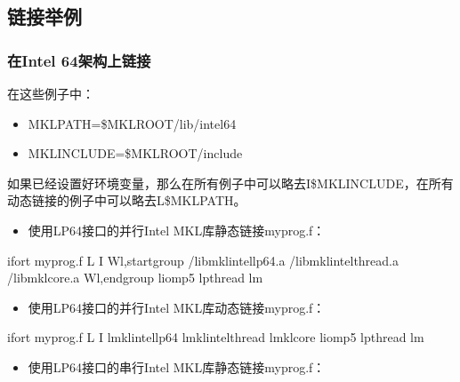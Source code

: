 \documentclass[a4paper,12pt,english]{sphinxmanual}
\begin{document}
\subsection{链接举例}
\label{\detokenize{intel-mkl/intel-mkl:id11}}

\subsubsection{在Intel 64架构上链接}
\label{\detokenize{intel-mkl/intel-mkl:intel-64}}
\sphinxAtStartPar
在这些例子中：
\begin{itemize}
\item {} 
\sphinxAtStartPar
MKLPATH=\$MKLROOT/lib/intel64

\item {} 
\sphinxAtStartPar
MKLINCLUDE=\$MKLROOT/include

\end{itemize}

\sphinxAtStartPar
如果已经设置好环境变量，那么在所有例子中可以略去\sphinxhyphen{}I\$MKLINCLUDE，在所有动态链接的例子中可以略去\sphinxhyphen{}L\$MKLPATH。
\begin{itemize}
\item {} 
\sphinxAtStartPar
使用LP64接口的并行Intel MKL库静态链接myprog.f：

\end{itemize}

\begin{sphinxVerbatim}[commandchars=\\\{\}]
ifort myprog.f \PYGZhy{}L \PYGZhy{}I 
\PYGZhy{}Wl,\PYGZhy{}\PYGZhy{}start\PYGZhy{}group /libmkl\PYGZus{}intel\PYGZus{}lp64.a /libmkl\PYGZus{}intel\PYGZus{}thread.a 
/libmkl\PYGZus{}core.a \PYGZhy{}Wl,\PYGZhy{}\PYGZhy{}end\PYGZhy{}group \PYGZhy{}liomp5 \PYGZhy{}lpthread \PYGZhy{}lm
\end{sphinxVerbatim}
\begin{itemize}
\item {} 
\sphinxAtStartPar
使用LP64接口的并行Intel MKL库动态链接myprog.f：

\end{itemize}

\begin{sphinxVerbatim}[commandchars=\\\{\}]
ifort myprog.f \PYGZhy{}L \PYGZhy{}I 
\PYGZhy{}lmkl\PYGZus{}intel\PYGZus{}lp64 \PYGZhy{}lmkl\PYGZus{}intel\PYGZus{}thread \PYGZhy{}lmkl\PYGZus{}core \PYGZhy{}liomp5 \PYGZhy{}lpthread \PYGZhy{}lm
\end{sphinxVerbatim}
\begin{itemize}
\item {} 
\sphinxAtStartPar
使用LP64接口的串行Intel MKL库静态链接myprog.f：

\end{itemize}
\end{document}
